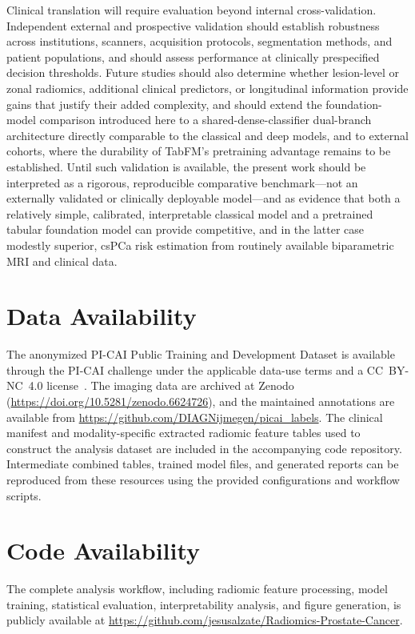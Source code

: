 \documentclass[11pt]{article}
\begin{document}
Clinical translation will require evaluation beyond internal cross-validation.
Independent external and prospective validation should establish robustness
across institutions, scanners, acquisition protocols, segmentation methods, and
patient populations, and should assess performance at clinically prespecified
decision thresholds. Future studies should also determine whether lesion-level
or zonal radiomics, additional clinical predictors, or longitudinal information
provide gains that justify their added complexity, and should extend the
foundation-model comparison introduced here to a shared-dense-classifier
dual-branch architecture directly comparable to the classical and deep models,
and to external cohorts, where the durability of TabFM's pretraining advantage
remains to be established. Until
such validation is available, the present work should be interpreted as a
rigorous, reproducible comparative benchmark---not an externally validated or
clinically deployable model---and as evidence that both a relatively simple,
calibrated, interpretable classical model and a pretrained tabular foundation
model can provide competitive, and in the latter case modestly superior, csPCa
risk estimation from routinely available biparametric MRI and clinical data.

\section*{Data Availability}
The anonymized PI-CAI Public Training and Development Dataset is available
through the PI-CAI challenge under the applicable data-use terms and a
CC~BY-NC~4.0 license~\citep{saha2023artificial}. The imaging data are archived
at Zenodo (\url{https://doi.org/10.5281/zenodo.6624726}), and the maintained
annotations are available from
\url{https://github.com/DIAGNijmegen/picai_labels}. The clinical manifest and
modality-specific extracted radiomic feature tables used to construct the
analysis dataset are included in the accompanying code repository. Intermediate
combined tables, trained model files, and generated reports can be reproduced
from these resources using the provided configurations and workflow scripts.

\section*{Code Availability}
The complete analysis workflow, including radiomic feature processing, model
training, statistical evaluation, interpretability analysis, and figure
generation, is publicly available at
\url{https://github.com/jesusalzate/Radiomics-Prostate-Cancer}.
\end{document}
